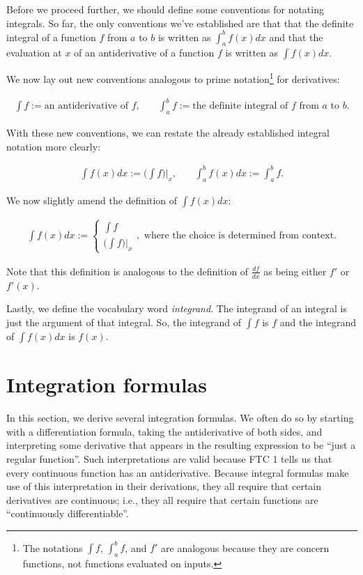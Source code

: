 \documentclass{article}
\begin{document}
Before we proceed further, we should define some conventions for notating integrals. So far, the only conventions we've established are that that the definite integral of a function $f$ from $a$ to $b$ is written as $\int_a^b f(x) dx$ and that the evaluation at $x$ of an antiderivative of a function $f$ is written as $\int f(x) dx$. 

We now lay out new conventions analogous to prime notation\footnote{The notations $\int f$, $\int_a^b f$, and $f'$ are analogous because they are concern functions, not functions evaluated on inputs.} for derivatives:

\begin{align*}
    \int f := \text{an antiderivative of $f$}, &\quad \int_a^b f := \text{the definite integral of $f$ from $a$ to $b$}.
\end{align*}

With these new conventions, we can restate the already established integral notation more clearly:

\begin{align*}
    \int f(x) dx := \Big(\int f\Big)\Big|_x, &\quad \int_a^b f(x) dx := \int_a^b f.
\end{align*}

We now slightly amend the definition of $\int f(x) dx$:

\begin{align*}
    \int f(x) dx := 
    \begin{cases}
        \int f \\
        \Big(\int f\Big)\Big|_x
    \end{cases},
    \text{ where the choice is determined from context}.
\end{align*}

Note that this definition is analogous to the definition of $\frac{df}{dx}$ as being either $f'$ or $f'(x)$.

\vspace{.5cm}

Lastly, we define the vocabulary word \textit{integrand}. The integrand of an integral is just the argument of that integral. So, the integrand of $\int f$ is $f$ and the integrand of $\int f(x) dx$ is $f(x)$.

\section*{Integration formulas}

In this section, we derive several integration formulas. We often do so by starting with a differentiation formula, taking the antiderivative of both sides, and interpreting some derivative that appears in the resulting expression to be ``just a regular function''. Such interpretations are valid because FTC 1 tells us that every continuous function has an antiderivative. Because integral formulas make use of this interpretation in their derivations, they all require that certain derivatives are continuous; i.e., they all require that certain functions are ``continuously differentiable''. 
\end{document}

